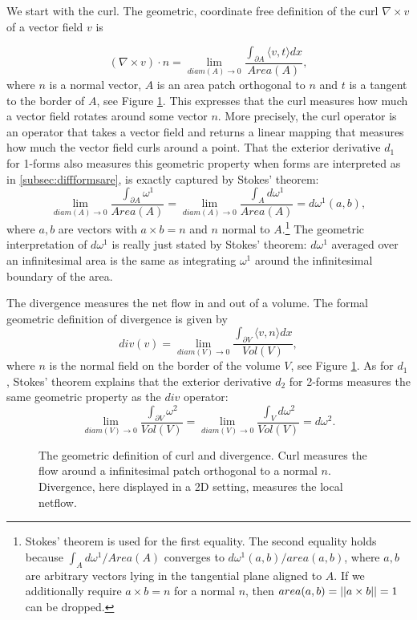 We start with the curl. The geometric, coordinate free definition of the curl $\nabla \times v$ of a vector field $v$ is 

\[(\nabla \times v) \cdot n = \lim_{diam(A)\rightarrow 0 } \frac{\int_{\partial A} \langle v , t \rangle dx}{Area(A)}, \]
where $n$ is a normal vector, $A$ is an area patch orthogonal to $n$ and $t$ is a tangent to the border of $A$, see Figure \ref{fig:6_curlDiv}. This expresses that the curl measures how much a vector field rotates around some vector $n$. More precisely, the curl operator is an operator that takes a vector field and returns a linear mapping that measures how much the vector field curls around a point. That the exterior derivative $d_1$ for 1-forms also measures this geometric property when forms are interpreted as in \ref{subsec:diffformsare}, is exactly captured by Stokes' theorem:
\[\lim_{diam(A)\rightarrow 0 }\frac{\int_{\partial A} \omega^1}{Area(A)} = \lim_{diam(A)\rightarrow 0 }\frac{\int_{A} d \omega^1}{Area(A)} = d \omega^1 (a,b),\]
where $a,b$ are vectors with $a\times b = n$ and $n$ normal to $A$.\footnote{Stokes' theorem is used for the first equality. The second equality holds because $\int_A d\omega^1 / Area(A)$ converges to $d\omega^1(a,b) / area(a,b)$, where $a, b$ are arbitrary vectors lying in the tangential plane aligned to $A$. If we additionally require $a \times b = n$ for a normal $n$, then $area(a,b) = \left| \left| a\times b \right| \right| = 1$ can be dropped.} The geometric interpretation of $d\omega^1$ is really just stated by Stokes' theorem: $d\omega^1$  averaged over an infinitesimal area is the same as integrating $\omega^1$ around the infinitesimal boundary of the area.

The divergence measures the net flow in and out of a volume. The formal geometric definition of divergence is given by
\[div(v) = \lim_{diam(V)\rightarrow 0 } \frac{\int_{\partial V} \langle v , n \rangle dx}{Vol(V)},\]
where $n$ is the normal field on the border of the volume $V$, see Figure \ref{fig:6_curlDiv}. As for $d_1$, Stokes' theorem explains that the exterior derivative $d_2$ for 2-forms measures the same geometric property as the $div$ operator:
\[\lim_{diam(V)\rightarrow 0 }\frac{\int_{\partial V} \omega^2}{Vol(V)} = \lim_{diam(V)\rightarrow 0 }\frac{\int_{V} d \omega^2}{Vol(V)} = d \omega^2.\]

\begin{figure}%
\begin{center}
\def\svgwidth{8cm}
%	
\end{center}
\caption{The geometric definition of curl and divergence. Curl measures the flow around a infinitesimal patch orthogonal to a normal $n$. Divergence, here displayed in a 2D setting, measures the local netflow. }%
\label{fig:6_curlDiv}%
\end{figure}
\newpage

